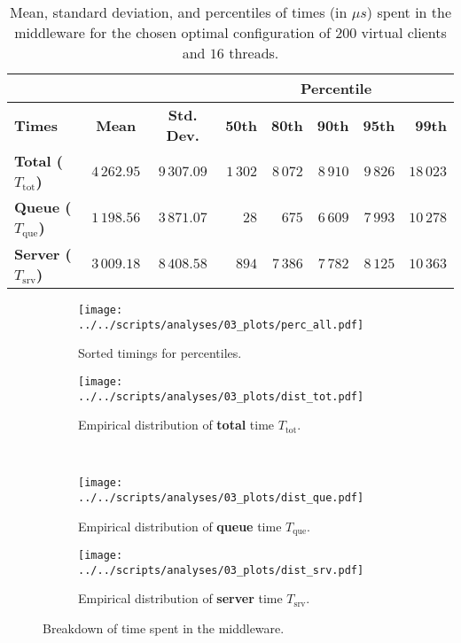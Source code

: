 \documentclass[11pt]{article}
\theoremstyle{definition}
\newcommand\Ttot{T_{\mathrm{tot}}}
\newcommand\Tque{T_{\mathrm{que}}}
\newcommand\Tsrv{T_{\mathrm{srv}}}
\renewcommand\b[1]{{\bf{#1}}}
\begin{document}
\begin{table}[h]
    \centering
    \small
    {
        \smallskip
        \begin{tabular}{|l||c|c||r|r|r|r|r|}
            \cline{4-8}
            \multicolumn{3}{c|}{} & \multicolumn{5}{c|}{\b{Percentile}}\\ 
            \hline
            \b{Times} & \b{Mean} & \b{Std. Dev.} & \b{50th} & \b{80th} & \b{90th} & \b{95th} & \b{99th} \\
            \hline
            \hline
            \b{Total ($\Ttot$)} & $4\,262.95$ & $9\,307.09$ & $1\,302$ & $8\,072$ & $8\,910$ & $9\,826$ & $18\,023$ \\
            \hline
            \b{Queue ($\Tque$)} & $1\,198.56$ & $3\,871.07$ & $28$ & $675$ & $6\,609$ & $7\,993$ & $10\,278$ \\ 
            \hline
            \b{Server ($\Tsrv$)} & $3\,009.18$ & $8\,408.58$ & $894$ & $7\,386$ & $7\,782$ & $8\,125$ & $10\,363$ \\ 
            \hline
        \end{tabular}
    }
    \caption{Mean, standard deviation, and percentiles of times (in $\mu s$) spent in the middleware for the chosen optimal configuration of $200$ virtual clients and $16$ threads.}
    \label{tab:breakdown}
\end{table}

\begin{figure}[!h]
    \newcommand\wdt{7.7cm}
    \centering
    \begin{subfigure}[t]{\wdt}
        \centering
        \texttt{[image: ../../scripts/analyses/03\_plots/perc\_all.pdf]}
        \caption{Sorted timings for percentiles.}\label{fig:breakdown-srt}
    \end{subfigure}
    \hspace{0.2cm}
    \begin{subfigure}[t]{\wdt}
        \centering
        \texttt{[image: ../../scripts/analyses/03\_plots/dist\_tot.pdf]}
        \caption{Empirical distribution of \b{total} time $\Ttot$.}\label{fig:breakdown-tot}
    \end{subfigure}
    \\\vspace{3mm}
    \begin{subfigure}[t]{\wdt}
        \centering
        \texttt{[image: ../../scripts/analyses/03\_plots/dist\_que.pdf]}
        \caption{Empirical distribution of \b{queue} time $\Tque$.}\label{fig:breakdown-que}
    \end{subfigure}
    \hspace{0.2cm}
    \begin{subfigure}[t]{\wdt}
        \centering
        \texttt{[image: ../../scripts/analyses/03\_plots/dist\_srv.pdf]}
        \caption{Empirical distribution of \b{server} time $\Tsrv$.}\label{fig:breakdown-srv}
    \end{subfigure}
    \caption{Breakdown of time spent in the middleware.}
    \label{fig:breakdown}
\end{figure}
\end{document}
